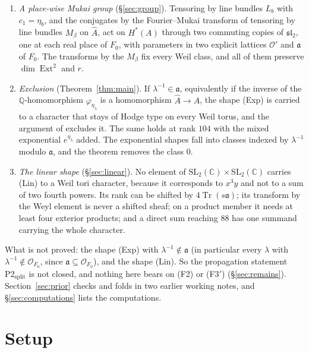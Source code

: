 \documentclass[11pt]{amsart}
\theoremstyle{definition}
\theoremstyle{remark}
\newcommand{\QQ}{\mathbb{Q}}
\newcommand{\CC}{\mathbb{C}}
\newcommand{\cO}{\mathcal{O}}
\newcommand{\fa}{\mathfrak{a}}
\newcommand{\Av}{\widehat{A}}
\newcommand{\Ext}{\operatorname{Ext}}
\newcommand{\Tr}{\operatorname{Tr}}
\newcommand{\SL}{\mathrm{SL}}
\begin{document}
\begin{enumerate}[label=(\arabic*),leftmargin=2.2em,itemsep=2pt]
\item \emph{A place-wise Mukai group} (\S\ref{sec:group}). Tensoring by line
  bundles $L_{b}$ with $c_{1}=\eta_{b}$, and the conjugates by the
  Fourier--Mukai transform of tensoring by line bundles $M_{\beta}$ on
  $\Av$, act on $H^{*}(A)$ through two commuting copies of
  $\mathfrak{sl}_{2}$, one at each real place of $F_{0}$, with parameters in
  two explicit lattices $\cO'$ and $\fa$ of $F_{0}$. The transforms by the
  $M_{\beta}$ fix every Weil class, and all of them preserve $\dim\Ext^{2}$
  and $r$.
\item \emph{Exclusion} (Theorem~\ref{thm:main}). If $\lambda^{-1}\in\fa$,
  equivalently if the inverse of the $\QQ$-homomorphism $\varphi_{\eta_{\lambda}}$
  is a homomorphism $\Av\to A$, the shape (Exp) is carried to a character that
  stays of Hodge type on every Weil torus, and the argument of
  \cite[Theorem~19.12]{BMB} excludes it. The same holds at rank $104$ with
  the mixed exponential $e^{\eta_{\lambda}}$ added. The exponential shapes
  fall into classes indexed by $\lambda^{-1}$ modulo $\fa$, and the theorem
  removes the class $0$.
\item \emph{The linear shape} (\S\ref{sec:linear}). No element of
  $\SL_{2}(\CC)\times\SL_{2}(\CC)$ carries (Lin) to a Weil tori character,
  because it corresponds to $x^{3}y$ and not to a sum of two fourth powers.
  Its rank can be shifted by $4\Tr(s\fa)$; its transform by the Weyl element
  is never a shifted sheaf; on a product member it needs at least four
  exterior products; and a direct sum reaching $88$ has one summand
  carrying the whole character.
\end{enumerate}

What is not proved: the shape (Exp) with $\lambda^{-1}\notin\fa$ (in
particular every $\lambda$ with $\lambda^{-1}\notin\cO_{F_{0}}$, since
$\fa\subseteq\cO_{F_{0}}$), and the shape (Lin). So the propagation statement
$\mathrm{P2}_{\mathrm{split}}$ is not closed, and nothing here bears on (F2)
or (F3$'$) (\S\ref{sec:remains}). Section~\ref{sec:prior} checks and folds in
two earlier working notes, and \S\ref{sec:computations} lists the
computations.

\section{Setup}\label{sec:setup}
\end{document}
